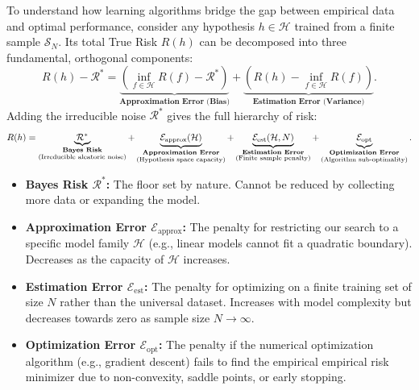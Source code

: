 \begin{intuition}
\label{box:risk_decomposition}
To understand how learning algorithms bridge the gap between empirical data and optimal performance, consider any hypothesis $h \in \mathcal{H}$ trained from a finite sample $\mathcal{S}_N$. Its total True Risk $R(h)$ can be decomposed into three fundamental, orthogonal components:
\begin{equation}
R(h) - \mathcal{R}^* = \underbrace{\left( \inf_{f \in \mathcal{H}} R(f) - \mathcal{R}^* \right)}_{\textbf{Approximation Error (Bias)}} + \underbrace{\left( R(h) - \inf_{f \in \mathcal{H}} R(f) \right)}_{\textbf{Estimation Error (Variance)}}.
\label{eq:excess_risk_decomposition}
\end{equation}
Adding the irreducible noise $\mathcal{R}^*$ gives the full hierarchy of risk:
\begin{equation}
R(h) = \underbrace{\mathcal{R}^*}_{\substack{\text{\textbf{Bayes Risk}} \\ \text{(Irreducible aleatoric noise)}}} + \underbrace{\mathcal{E}_{\text{approx}}(\mathcal{H})}_{\substack{\text{\textbf{Approximation Error}} \\ \text{(Hypothesis space capacity)}}} + \underbrace{\mathcal{E}_{\text{est}}(\mathcal{H}, N)}_{\substack{\text{\textbf{Estimation Error}} \\ \text{(Finite sample penalty)}}} + \underbrace{\mathcal{E}_{\text{opt}}}_{\substack{\text{\textbf{Optimization Error}} \\ \text{(Algorithm sub-optimality)}}}.
\end{equation}
\begin{itemize}[noitemsep]
  \item \textbf{Bayes Risk $\mathcal{R}^*$:} The floor set by nature. Cannot be reduced by collecting more data or expanding the model.
  \item \textbf{Approximation Error $\mathcal{E}_{\text{approx}}$:} The penalty for restricting our search to a specific model family $\mathcal{H}$ (e.g., linear models cannot fit a quadratic boundary). Decreases as the capacity of $\mathcal{H}$ increases.
  \item \textbf{Estimation Error $\mathcal{E}_{\text{est}}$:} The penalty for optimizing on a finite training set of size $N$ rather than the universal dataset. Increases with model complexity but decreases towards zero as sample size $N \to \infty$.
  \item \textbf{Optimization Error $\mathcal{E}_{\text{opt}}$:} The penalty if the numerical optimization algorithm (e.g., gradient descent) fails to find the empirical empirical risk minimizer due to non-convexity, saddle points, or early stopping.
\end{itemize}
\end{intuition}

